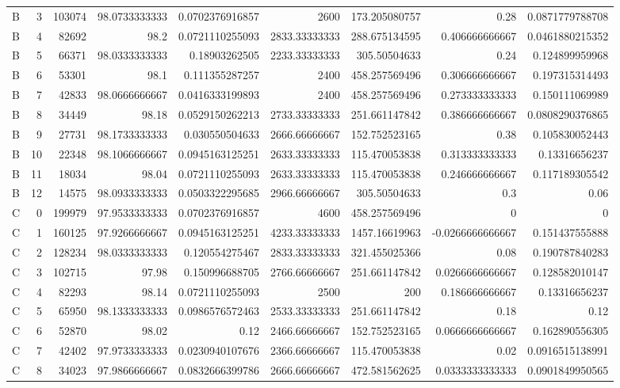 \begin{tabular}{lrrrrrrrr}
B & 3 & 103074 & 98.0733333333 & 0.0702376916857 & 2600 & 173.205080757 & 0.28 & 0.0871779788708 \\
B & 4 & 82692 & 98.2 & 0.0721110255093 & 2833.33333333 & 288.675134595 & 0.406666666667 & 0.0461880215352 \\
B & 5 & 66371 & 98.0333333333 & 0.18903262505 & 2233.33333333 & 305.50504633 & 0.24 & 0.124899959968 \\
B & 6 & 53301 & 98.1 & 0.111355287257 & 2400 & 458.257569496 & 0.306666666667 & 0.197315314493 \\
B & 7 & 42833 & 98.0666666667 & 0.0416333199893 & 2400 & 458.257569496 & 0.273333333333 & 0.150111069989 \\
B & 8 & 34449 & 98.18 & 0.0529150262213 & 2733.33333333 & 251.661147842 & 0.386666666667 & 0.0808290376865 \\
B & 9 & 27731 & 98.1733333333 & 0.030550504633 & 2666.66666667 & 152.752523165 & 0.38 & 0.105830052443 \\
B & 10 & 22348 & 98.1066666667 & 0.0945163125251 & 2633.33333333 & 115.470053838 & 0.313333333333 & 0.13316656237 \\
B & 11 & 18034 & 98.04 & 0.0721110255093 & 2633.33333333 & 115.470053838 & 0.246666666667 & 0.117189305542 \\
B & 12 & 14575 & 98.0933333333 & 0.0503322295685 & 2966.66666667 & 305.50504633 & 0.3 & 0.06 \\
C & 0 & 199979 & 97.9533333333 & 0.0702376916857 & 4600 & 458.257569496 & 0 & 0 \\
C & 1 & 160125 & 97.9266666667 & 0.0945163125251 & 4233.33333333 & 1457.16619963 & -0.0266666666667 & 0.151437555888 \\
C & 2 & 128234 & 98.0333333333 & 0.120554275467 & 2833.33333333 & 321.455025366 & 0.08 & 0.190787840283 \\
C & 3 & 102715 & 97.98 & 0.150996688705 & 2766.66666667 & 251.661147842 & 0.0266666666667 & 0.128582010147 \\
C & 4 & 82293 & 98.14 & 0.0721110255093 & 2500 & 200 & 0.186666666667 & 0.13316656237 \\
C & 5 & 65950 & 98.1333333333 & 0.0986576572463 & 2533.33333333 & 251.661147842 & 0.18 & 0.12 \\
C & 6 & 52870 & 98.02 & 0.12 & 2466.66666667 & 152.752523165 & 0.0666666666667 & 0.162890556305 \\
C & 7 & 42402 & 97.9733333333 & 0.0230940107676 & 2366.66666667 & 115.470053838 & 0.02 & 0.0916515138991 \\
C & 8 & 34023 & 97.9866666667 & 0.0832666399786 & 2666.66666667 & 472.581562625 & 0.0333333333333 & 0.0901849950565 \\

\end{tabular}
